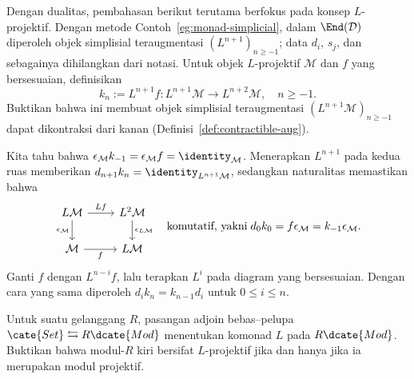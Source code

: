 
	Dengan dualitas, pembahasan berikut terutama berfokus pada konsep
	$L$-projektif. Dengan metode Contoh~\ref{eg:monad-simplicial}, dalam
	$\End(\mathcal{D})$ diperoleh objek simplisial teraugmentasi
	$(L^{n+1})_{n\geq-1}$; data $d_i$, $s_j$, dan sebagainya dihilangkan dari
	notasi. Untuk objek $L$-projektif $\mathcal{M}$ dan $f$ yang
	bersesuaian, definisikan
	\[ k_n := L^{n+1} f : L^{n+1} \mathcal{M} \to L^{n+2} \mathcal{M}, \quad n \geq -1. \]
	Buktikan bahwa ini membuat objek simplisial teraugmentasi
	$(L^{n+1}\mathcal{M})_{n\geq-1}$ dapat dikontraksi dari kanan
	(Definisi~\ref{def:contractible-aug}).

	\begin{hint}
		Kita tahu bahwa
		$\epsilon_{\mathcal{M}}k_{-1}=\epsilon_{\mathcal{M}}f
		=\identity_{\mathcal{M}}$. Menerapkan $L^{n+1}$ pada kedua ruas
		memberikan
		$d_{n+1}k_n=\identity_{L^{n+1}\mathcal{M}}$, sedangkan naturalitas
		memastikan bahwa
		\[\begin{tikzcd}
			L\mathcal{M} \arrow[r, "Lf"] \arrow[d, "{\epsilon_{\mathcal{M}}}"'] & L^2 \mathcal{M} \arrow[d, "{\epsilon_{L\mathcal{M}}}"] \\
			\mathcal{M} \arrow[r, "f"'] & L\mathcal{M}
		\end{tikzcd} \quad\text{komutatif, yakni}\; d_0 k_0 = f\epsilon_{\mathcal{M}} = k_{-1} \epsilon_{\mathcal{M}}. \]
		Ganti $f$ dengan $L^{n-i}f$, lalu terapkan $L^i$ pada diagram yang
		bersesuaian. Dengan cara yang sama diperoleh
		$d_ik_n=k_{n-1}d_i$ untuk $0\leq i\leq n$.
	\end{hint}

	\item Untuk suatu gelanggang $R$, pasangan adjoin bebas--pelupa
	$\cate{Set}\leftrightarrows R\dcate{Mod}$ menentukan komonad $L$ pada
	$R\dcate{Mod}$. Buktikan bahwa modul-$R$ kiri bersifat $L$-projektif
	jika dan hanya jika ia merupakan modul projektif.

